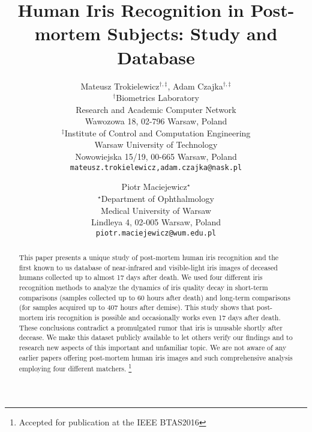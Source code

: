 \documentclass[10pt,twocolumn,letterpaper]{article}
\begin{document}
\title{Human Iris Recognition in Post-mortem Subjects: Study and Database}

\author{Mateusz Trokielewicz$^{\dag,\ddag}$, Adam Czajka$^{\dag,\ddag}$\\
$^{\dag}$Biometrics Laboratory\\
Research and Academic Computer Network\\
Wawozowa 18, 02-796 Warsaw, Poland\\
$^{\ddag}$Institute of Control and Computation Engineering\\
Warsaw University of Technology\\
Nowowiejska 15/19, 00-665 Warsaw, Poland\\
{\tt\small {mateusz.trokielewicz,adam.czajka}@nask.pl}
\and
Piotr Maciejewicz$^{\star}$\\
$^{\star}$Department of Ophthalmology\\
Medical University of Warsaw\\
Lindleya 4, 02-005 Warsaw, Poland\\
{\tt\small piotr.maciejewicz@wum.edu.pl}
}
\maketitle
\thispagestyle{empty}

\begin{abstract}

This paper presents a unique study of post-mortem human iris recognition and the first known to us database of near-infrared and visible-light iris images of deceased humans collected up to almost 17 days after death. We used four different iris recognition methods to analyze the dynamics of iris quality decay in short-term comparisons (samples collected up to 60 hours after death) and long-term comparisons (for samples acquired up to 407 hours after demise). This study shows that post-mortem iris recognition is possible and occasionally works even 17 days after death. These conclusions contradict a promulgated rumor that iris is unusable shortly after decease. We make this dataset publicly available to let others verify our findings and to research new aspects of this important and unfamiliar topic. We are not aware of any earlier papers offering post-mortem human iris images and such comprehensive analysis employing four different matchers.
\let\thefootnote\relax\footnote{Accepted for publication at the IEEE BTAS2016}
\end{abstract}
\end{document}

